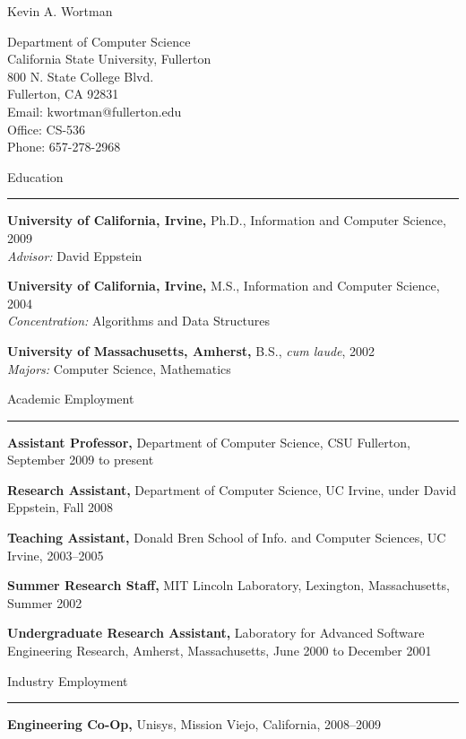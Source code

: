 \documentclass[11pt]{letter}
\begin{document}
\newcommand{\heading}[1]{ \vspace{11pt} {\Large #1} \\ \rule{6.5in}{.5pt} }

{\Large Kevin A. Wortman}
\begin{multicols}{2}
Department of Computer Science\\
California State University, Fullerton\\
800 N. State College Blvd.\\
Fullerton, CA 92831\\

Email: kwortman@fullerton.edu\\
Office: CS-536\\
Phone: 657-278-2968\\
\end{multicols}

\heading{Education}

\textbf{University of California, Irvine,} Ph.D., Information and Computer Science, 2009 \\
\emph{Advisor:} David Eppstein

\textbf{University of California, Irvine,} M.S., Information and Computer Science, 2004 \\
\emph{Concentration:} Algorithms and Data Structures

\textbf{University of Massachusetts, Amherst,} B.S., \emph{cum laude}, 2002\\
\emph{Majors:} Computer Science, Mathematics

\heading{Academic Employment}

\textbf{Assistant Professor,} Department of Computer Science, CSU Fullerton,  September 2009 to present

\textbf{Research Assistant,} Department of Computer Science, UC Irvine, under David Eppstein, Fall 2008

\textbf{Teaching Assistant,} Donald Bren School of Info. and Computer Sciences, UC Irvine,  2003--2005

\textbf{Summer Research Staff,} MIT Lincoln Laboratory, Lexington, Massachusetts, Summer 2002

\textbf{Undergraduate Research Assistant,} Laboratory for Advanced Software Engineering Research, Amherst, Massachusetts, June 2000 to December 2001

\heading{Industry Employment}

\textbf{Engineering Co-Op,} Unisys, Mission Viejo, California, 2008--2009 %
\end{document}
